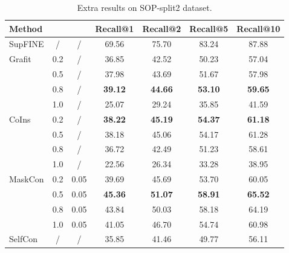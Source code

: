 \documentclass[10pt,twocolumn,letterpaper]{article}
\begin{document}
\begin{table}[htbp]
\centering
\begin{tabular}{@{}l|c|c|cccc@{}}
\toprule
Method                  &  &  & Recall@1       & Recall@2       & Recall@5       & Recall@10      \\ \midrule
SupFINE                 & /   & /      & 69.56          & 75.70          & 83.24          & 87.88          \\ \midrule
\multirow{4}{*}{Grafit} & 0.2 & /      & 36.85          & 42.52          & 50.23          & 57.04          \\
                        & 0.5 & /      & 37.98          & 43.69          & 51.67          & 57.98          \\
                        & 0.8 & /      & \textbf{39.12} & \textbf{44.66} & \textbf{53.10} & \textbf{59.65} \\
                        & 1.0 & /      & 25.07          & 29.24          & 35.85          & 41.59          \\ \midrule
\multirow{4}{*}{CoIns}  & 0.2 & /      & \textbf{38.22} & \textbf{45.19} & \textbf{54.37} & \textbf{61.18} \\
                        & 0.5 & /      & 38.18          & 45.06          & 54.17          & 61.28          \\
                        & 0.8 & /      & 36.72          & 42.49          & 51.23          & 58.61          \\
                        & 1.0 & /      & 22.56          & 26.34          & 33.28          & 38.95          \\ \midrule
MaskCon                 & 0.2 & 0.05   & 39.69          & 45.69          & 53.70          & 60.05          \\
                        & 0.5 & 0.05   & \textbf{45.36} & \textbf{51.07} & \textbf{58.91} & \textbf{65.52} \\
                        & 0.8 & 0.05   & 43.84          & 50.03          & 58.18          & 64.19          \\
                        & 1.0 & 0.05   & 41.05          & 46.70          & 54.74          & 60.98          \\ \midrule
SelfCon                 & /   & /      & 35.85          & 41.46          & 49.77          & 56.11          \\ \bottomrule
\end{tabular}
\caption{Extra results on SOP-split2 dataset.}
\label{tab:sop-split2}
\end{table}
\end{document}
